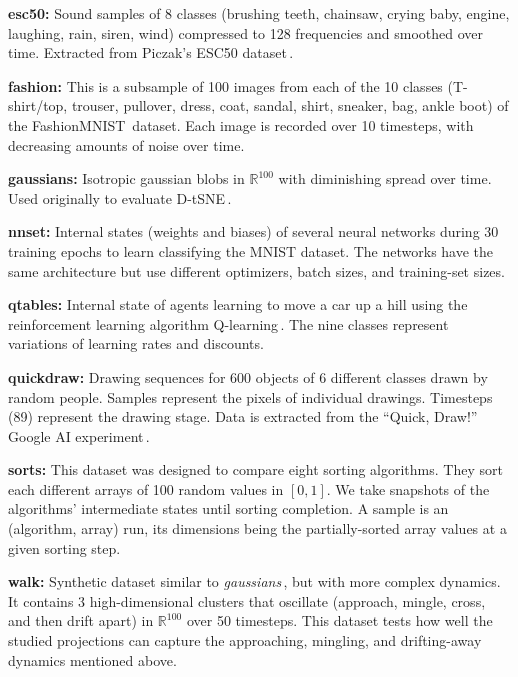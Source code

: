 \noindent \textbf{esc50:} Sound samples of 8 classes (brushing teeth, chainsaw, crying baby, engine, laughing, rain, siren, wind) compressed to 128 frequencies and smoothed over time. Extracted from Piczak's ESC50 dataset\,\citep{dataset:esc50}.

\noindent \textbf{fashion:} This is a subsample of 100 images from each of the 10 classes (T-shirt/top, trouser, pullover, dress, coat, sandal, shirt, sneaker, bag, ankle boot) of the FashionMNIST\,\citep{dataset:Xiao2017} dataset. Each image is recorded over 10 timesteps, with decreasing amounts of noise over time.

\noindent \textbf{gaussians:} Isotropic gaussian blobs in $\mathbb{R}^{100}$ with diminishing spread over time. Used originally to evaluate D-tSNE\,\citep{Rauber2016}.

\noindent \textbf{nnset:} Internal states (weights and biases) of several neural networks during 30 training epochs to learn classifying the MNIST dataset. The networks have the same architecture but use different optimizers, batch sizes, and training-set sizes.

\noindent \textbf{qtables:} Internal state of agents learning to move a car up a hill using the reinforcement learning algorithm Q-learning\,\citep{qlearning}. The nine classes represent variations of learning rates and discounts.

\noindent \textbf{quickdraw:} Drawing sequences for 600 objects of 6 different classes drawn by random people. Samples represent the pixels of individual drawings. Timesteps (89) represent the drawing stage. Data is extracted from the ``Quick, Draw!'' Google AI experiment\,\citep{dataset:quickdraw}.

\noindent \textbf{sorts:} This dataset was designed to compare eight sorting algorithms. They sort each different arrays of 100 random values in $[0,1]$. 
We take snapshots of the algorithms' intermediate states until sorting completion. A sample is an (algorithm, array) run, its dimensions being the partially-sorted array values at a given sorting step.

\noindent \textbf{walk:} Synthetic dataset similar to \emph{gaussians}\,\citep{Rauber2016}, but with more complex dynamics. It contains 3 high-dimensional clusters that oscillate (approach, mingle, cross, and then drift apart) in $\mathbb{R}^{100}$ over 50 timesteps. This dataset tests how well the studied projections can capture the approaching, mingling, and drifting-away dynamics mentioned above.

